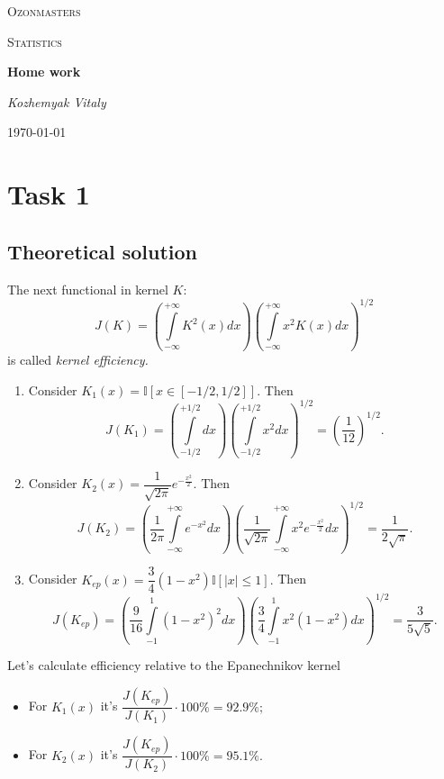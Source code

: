 \documentclass[a4paper, 12pt]{article}
\begin{document}
 

\begin{titlepage}
	\centering
	{\scshape\LARGE Ozonmasters \par}
	\vspace{1cm}
	{\scshape\Large Statistics \par}
	\vspace{1.5cm}
	{\huge\bfseries Home work \par}
	\vspace{2cm}
	{\Large\itshape Kozhemyak Vitaly \par}
	\vfill

	{\large \today\par}
\end{titlepage}
  
\tableofcontents

\newpage
\section{Task 1}
\subsection{Theoretical solution}
The next functional in kernel $K:$
$$
J(K) = \left( \int \limits_{- \infty}^{+\infty} K^2(x)dx \right) \left( \int \limits_{- \infty}^{+\infty} x^2 K(x)dx \right)^{1/2}
$$
is called \textit{kernel efficiency.}
\begin{enumerate}
	\item Consider $K_1(x) = \mathbb{I}[x \in [-1/2, 1/2]].$ Then
$$
J(K_1) = \left( \int \limits_{- 1/2}^{+1/2} dx \right) \left( \int \limits_{- 1/2}^{+1/2} x^2 dx \right)^{1/2} = \left( \dfrac{1}{12} \right)^{1/2}.
$$
	\item Consider $K_2(x) = \dfrac{1}{\sqrt{2 \pi}} e^{-\frac{x^2}{2}}.$ Then
$$
J(K_2) = \left( \dfrac{1}{2 \pi} \int \limits_{- \infty}^{+\infty} e^{-x^2} dx \right) \left( \dfrac{1}{\sqrt{2 \pi}} \int \limits_{- \infty}^{+ \infty} x^2 e^{-\frac{x^2}{2}} dx \right)^{1/2} = \dfrac{1}{2 \sqrt{\pi}}.
$$
	\item Consider $K_{ep}(x) = \dfrac{3}{4} (1 - x^2) \mathbb{I}[|x| \leqslant 1].$ Then
	$$
J(K_{ep}) = \left( \dfrac{9}{16} \int \limits_{- 1}^{1} (1-x^2)^2 dx \right) \left( \dfrac{3}{4} \int \limits_{-1}^{1} x^2 (1-x^2) dx \right)^{1/2} = \dfrac{3}{5 \sqrt{5}}.
$$
\end{enumerate}
Let's calculate efficiency relative to the Epanechnikov kernel
\begin{itemize}
	\item For $K_1(x)$ it's $\dfrac{J(K_{ep})}{J(K_1)} \cdot 100\% = 92.9\%;$
	\item For $K_2(x)$ it's $\dfrac{J(K_{ep})}{J(K_2)} \cdot 100\% = 95.1\%.$
\end{itemize}
\end{document}
